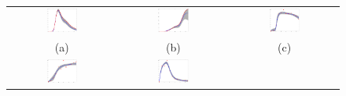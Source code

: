 \documentclass{article}
\begin{document}
 

\begin{figure}
\begin{center}
\begin{tabular}{ccc}
      \includegraphics[width=0.3\textwidth]{../diagrams/toyMarch25MCMC19-Sep-2010logOnePlusExpgenHillTFproteins_Rep1TF1} &
      \includegraphics[width=0.3\textwidth]{../diagrams/toyMarch25MCMC19-Sep-2010logOnePlusExpgenHillTFproteins_Rep1TF2} &      
      \includegraphics[width=0.3\textwidth]{../diagrams/toyMarch25MCMC19-Sep-2010logOnePlusExpgenHillReplica1GENEmRNA17}\\ 
      (a) & (b) & (c) \\
      \includegraphics[width=0.3\textwidth]{../diagrams/toyMarch25MCMC19-Sep-2010logOnePlusExpgenHillReplica1GENEmRNA5} &
      \includegraphics[width=0.3\textwidth]{../diagrams/toyMarch25MCMC19-Sep-2010logOnePlusExpgenHillReplica1GENEmRNA16} &      

\end{tabular}
\end{center}
\end{figure}
\end{document}
